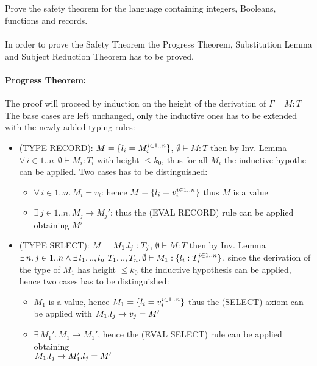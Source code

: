 \subsection{}

Prove the safety theorem for the language containing integers, Booleans, functions and records.\\~\\
In order to prove the Safety Theorem the Progress Theorem, Substitution Lemma and
Subject Reduction Theorem has to be proved.

\paragraph*{Progress Theorem:\\}
The proof will proceed by induction on the height of the derivation of $\Gamma \vdash M: T$
The base cases are left unchanged, only the inductive ones has to be extended with the newly
added typing rules:

\begin{itemize}
	\item (TYPE RECORD): $M= \{l_i=M_i^{i \in 1..n}\}$, $\emptyset \vdash M: T$ then by Inv. Lemma
	      $\forall\, i \in 1..n.\, \emptyset \vdash M_i: T_i$ with height $\le k_0$, thus for all $M_i$
	      the inductive hypothe can be applied. Two cases has to be distinguished:
	      \begin{itemize}
		      \item $\forall\, i \in 1..n.\, M_i = v_i$: hence $M = \{l_i=v_i^{i \in 1..n}\}$ thus
		            $M$ is a value
		      \item $\exists\, j \in 1..n.\, M_j \to M_j'$: thus the (EVAL RECORD) rule can be applied
		            obtaining $M'$
	      \end{itemize}
	\item (TYPE SELECT): $M = M_1.l_j: T_j$, $\emptyset \vdash M: T$ then by Inv. Lemma\\
	      $\exists\, n.\, j \in 1..n \wedge \exists\, l_1,..,l_n\ T_1,..,T_n.\, \emptyset \vdash M_1 : \{l_i: T_i^{i \in 1..n}\}$,
	      since the derivation of the type of $M_1$ has height $\le k_0$ the inductive hypothesis
	      can be applied, hence two cases has to be distinguished:
	      \begin{itemize}
		      \item $M_1$ is a value, hence $M_1 = \{l_i = v_i^{i \in 1..n}\}$ thus the (SELECT)
		            axiom can be applied with $M_1.l_j \to v_j = M'$
		      \item $\exists\, M_1'.\, M_1 \to M_1'$, hence the (EVAL SELECT) rule can be applied
		            obtaining\\
                $M_1.l_j \to M_1'.l_j = M'$
	      \end{itemize}
\end{itemize}

